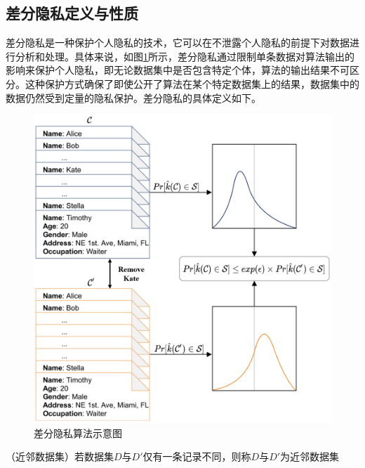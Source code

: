 \subsection{差分隐私定义与性质}


差分隐私是一种保护个人隐私的技术，它可以在不泄露个人隐私的前提下对数据进行分析和处理。具体来说，如图\ref{DP_demo}所示，差分隐私通过限制单条数据对算法输出的影响来保护个人隐私，即无论数据集中是否包含特定个体，算法的输出结果不可区分。这种保护方式确保了即使公开了算法在某个特定数据集上的结果，数据集中的数据仍然受到定量的隐私保护。差分隐私的具体定义如下。

\begin{figure}[h]
	\centering
	\includegraphics[width=0.8\linewidth]{figures/DP.png}
	\caption{差分隐私算法示意图}
	\label{DP_demo}
\end{figure}

\begin{definition}
	（近邻数据集\cite{dwork2006our}）若数据集$D$与$D'$仅有一条记录不同，则称$D$与$D'$为近邻数据集
\end{definition}



